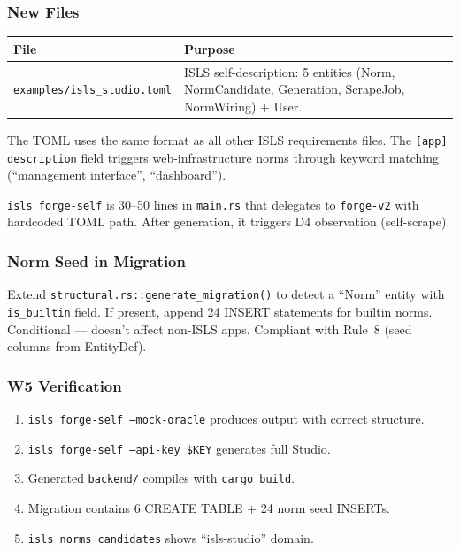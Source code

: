 \documentclass[11pt,a4paper]{article}
\begin{document}
\subsubsection{New Files}

\begin{longtable}{lp{10cm}}
\toprule
\textbf{File} & \textbf{Purpose} \\
\midrule
\texttt{examples/isls\_studio.toml}
  & ISLS self-description: 5 entities (Norm, NormCandidate, 
    Generation, ScrapeJob, NormWiring) + User. \\
\bottomrule
\end{longtable}

The TOML uses the same format as all other ISLS requirements files. 
The \texttt{[app] description} field triggers web-infrastructure 
norms through keyword matching (``management interface'', ``dashboard'').

\texttt{isls forge-self} is 30--50 lines in \texttt{main.rs} that 
delegates to \texttt{forge-v2} with hardcoded TOML path. After 
generation, it triggers D4 observation (self-scrape).

\subsubsection{Norm Seed in Migration}

Extend \texttt{structural.rs::generate\_migration()} to detect a 
``Norm'' entity with \texttt{is\_builtin} field. If present, append 
24 INSERT statements for builtin norms. Conditional --- doesn't 
affect non-ISLS apps. Compliant with Rule~8 (seed columns from 
EntityDef).

\subsubsection{W5 Verification}

\begin{enumerate}[nosep]
\item \texttt{isls forge-self --mock-oracle} produces output with 
      correct structure.
\item \texttt{isls forge-self --api-key \$KEY} generates full Studio.
\item Generated \texttt{backend/} compiles with \texttt{cargo build}.
\item Migration contains 6 CREATE TABLE + 24 norm seed INSERTs.
\item \texttt{isls norms candidates} shows ``isls-studio'' domain.
\end{enumerate}
\end{document}
